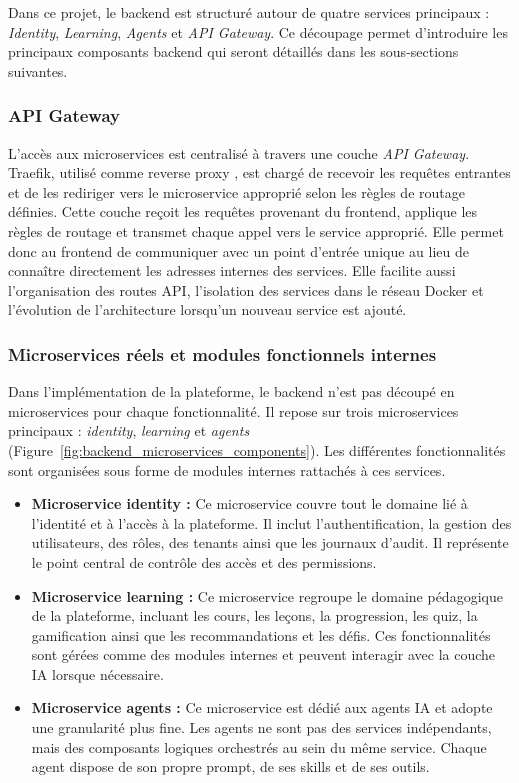 Dans ce projet, le backend est structuré autour de quatre services principaux :
\textit{Identity}, \textit{Learning}, \textit{Agents} et \textit{API Gateway}. Ce découpage permet
d'introduire les principaux composants backend qui seront détaillés dans les sous-sections
suivantes.

\subsubsection{API Gateway}

L'accès aux microservices est centralisé à travers une couche \textit{API Gateway}. Traefik, utilisé comme reverse proxy \cite{traefik_official}, est chargé de recevoir les requêtes entrantes et de les rediriger vers le microservice approprié selon les règles de routage définies. Cette couche reçoit les requêtes provenant du frontend, applique les règles de routage et transmet chaque appel vers le service approprié. Elle permet donc au frontend de communiquer avec un point d'entrée unique au lieu de connaître directement les adresses internes des services. Elle facilite aussi l'organisation des routes API, l'isolation des services dans le réseau Docker et l'évolution de l'architecture lorsqu'un nouveau service est ajouté.

\subsubsection{Microservices réels et modules fonctionnels internes}

Dans l'implémentation de la plateforme, le backend n'est pas découpé en microservices pour chaque fonctionnalité. Il repose sur trois microservices principaux : \textit{identity}, \textit{learning} et \textit{agents} (Figure~\ref{fig:backend_microservices_components}). Les différentes fonctionnalités sont organisées sous forme de modules internes rattachés à ces services.

\begin{itemize}
    \item \textbf{Microservice identity :} Ce microservice couvre tout le domaine lié à l'identité et à l'accès à la plateforme. Il inclut l'authentification, la gestion des utilisateurs, des rôles, des tenants ainsi que les journaux d'audit. Il représente le point central de contrôle des accès et des permissions.

    \item \textbf{Microservice learning :} Ce microservice regroupe le domaine pédagogique de la plateforme, incluant les cours, les leçons, la progression, les quiz, la gamification ainsi que les recommandations et les défis. Ces fonctionnalités sont gérées comme des modules internes et peuvent interagir avec la couche IA lorsque nécessaire.

    \item \textbf{Microservice agents :} Ce microservice est dédié aux agents IA et adopte une granularité plus fine. Les agents ne sont pas des services indépendants, mais des composants logiques orchestrés au sein du même service. Chaque agent dispose de son propre prompt, de ses skills et de ses outils.
\end{itemize}

